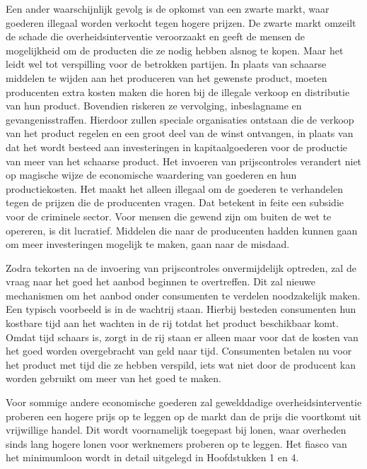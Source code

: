Een ander waarschijnlijk gevolg is de opkomst van een zwarte markt, waar goederen illegaal worden verkocht tegen hogere prijzen. De zwarte markt omzeilt de schade die overheidsinterventie veroorzaakt en geeft de mensen de mogelijkheid om de producten die ze nodig hebben alsnog te kopen. Maar het leidt wel tot verspilling voor de betrokken partijen. In plaats van schaarse middelen te wijden aan het produceren van het gewenste product, moeten producenten extra kosten maken die horen bij de illegale verkoop en distributie van hun product. Bovendien riskeren ze vervolging, inbeslagname en gevangenisstraffen. Hierdoor zullen speciale organisaties ontstaan die de verkoop van het product regelen en een groot deel van de winst ontvangen, in plaats van dat het wordt besteed aan investeringen in kapitaalgoederen voor de productie van meer van het schaarse product. Het invoeren van prijscontroles verandert niet op magische wijze de economische waardering van goederen en hun productiekosten. Het maakt het alleen illegaal om de goederen te verhandelen tegen de prijzen die de producenten vragen. Dat betekent in feite een subsidie voor de criminele sector. Voor mensen die gewend zijn om buiten de wet te opereren, is dit lucratief. Middelen die naar de producenten hadden kunnen gaan om meer investeringen mogelijk te maken, gaan naar de misdaad.

Zodra tekorten na de invoering van prijscontroles onvermijdelijk optreden, zal de vraag naar het goed het aanbod beginnen te overtreffen. Dit zal nieuwe mechanismen om het aanbod onder consumenten te verdelen noodzakelijk maken. Een typisch voorbeeld is in de wachtrij staan. Hierbij besteden consumenten hun kostbare tijd aan het wachten in de rij totdat het product beschikbaar komt. Omdat tijd schaars is, zorgt in de rij staan er alleen maar voor dat de kosten van het goed worden overgebracht van geld naar tijd. Consumenten betalen nu voor het product met tijd die ze hebben verspild, iets wat niet door de producent kan worden gebruikt om meer van het goed te maken.

Voor sommige andere economische goederen zal gewelddadige overheidsinterventie proberen een hogere prijs op te leggen op de markt dan de prijs die voortkomt uit vrijwillige handel. Dit wordt voornamelijk toegepast bij lonen, waar overheden sinds lang hogere lonen voor werknemers proberen op te leggen. Het fiasco van het minimumloon wordt in detail uitgelegd in Hoofdstukken 1 en 4.

